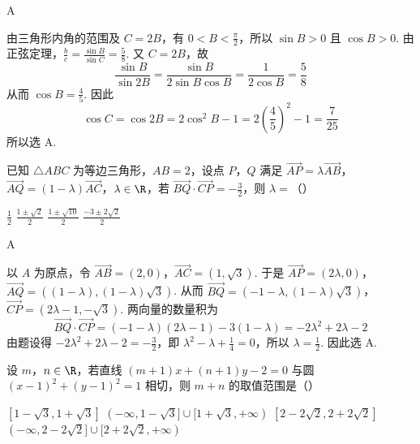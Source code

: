 \begin{answer}
A
\end{answer}

\begin{solution}
由三角形内角的范围及 \(C=2B\)，有 \(0<B<\frac\pi2\)，所以 \(\sin B>0\) 且 \(\cos B>0\). 由正弦定理，\(\frac{b}{c}=\frac{\sin B}{\sin C}=\frac{5}{8}\). 又 \(C=2B\)，故
\[
\frac{\sin B}{\sin2B}=\frac{\sin B}{2\sin B\cos B}=\frac{1}{2\cos B}=\frac58
\]
从而 \(\cos B=\frac45\). 因此
\[
\cos C=\cos2B=2\cos^2B-1=2\left(\frac45\right)^2-1=\frac7{25}
\]
所以选 A.
\end{solution}

\begin{problem}
已知 \(\triangle ABC\) 为等边三角形，\(AB = 2\)，设点 \(P\)，\(Q\) 满足 \(\overrightarrow{AP} = \lambda \overrightarrow{AB}\)，\(\overrightarrow{AQ} = (1 - \lambda) \overrightarrow{AC}\)，\(\lambda \in \R\)，若 \(\overrightarrow{BQ} \cdot \overrightarrow{CP} = -\frac{3}{2}\)，则 \(\lambda =\)（\quad）

\choices
    {\( \frac{1}{2} \)}
    {\( \frac{1 \pm \sqrt{2}}{2} \)}
    {\(\frac{1 \pm \sqrt{10}}{2}\)}
    {\(\frac{-3 \pm 2\sqrt{2}}{2}\)}
\end{problem}

\begin{answer}
A
\end{answer}

\begin{solution}
以 \(A\) 为原点，令 \(\overrightarrow{AB}=(2,0)\)，\(\overrightarrow{AC}=(1,\sqrt3)\). 于是 \(\overrightarrow{AP}=(2\lambda,0)\)，\(\overrightarrow{AQ}=((1-\lambda),(1-\lambda)\sqrt3)\).
从而
\(\overrightarrow{BQ}=(-1-\lambda,(1-\lambda)\sqrt3)\)，\(\overrightarrow{CP}=(2\lambda-1,-\sqrt3)\).
两向量的数量积为
\[
\overrightarrow{BQ}\cdot\overrightarrow{CP}=(-1-\lambda)(2\lambda-1)-3(1-\lambda)=-2\lambda^2+2\lambda-2
\]
由题设得 \(-2\lambda^2+2\lambda-2=-\frac32\)，即 \(\lambda^2-\lambda+\frac14=0\)，所以 \(\lambda=\frac12\). 因此选 A.
\end{solution}

\begin{problem}
设 \(m\)，\(n \in \R\)，若直线 \((m + 1)x + (n + 1)y - 2 = 0\) 与圆 \((x - 1)^2 + (y - 1)^2 = 1\) 相切，则 \(m + n\) 的取值范围是（\quad）

\choices
    {\([1 - \sqrt{3}, 1 + \sqrt{3}]\)}
    {\((-\infty, 1 - \sqrt{3}] \cup [1 + \sqrt{3}, +\infty)\)}
    {\([2 - 2\sqrt{2}, 2 + 2\sqrt{2}]\)}
    {\((-\infty, 2 - 2\sqrt{2}] \cup [2 + 2\sqrt{2}, +\infty)\)}
\end{problem}

